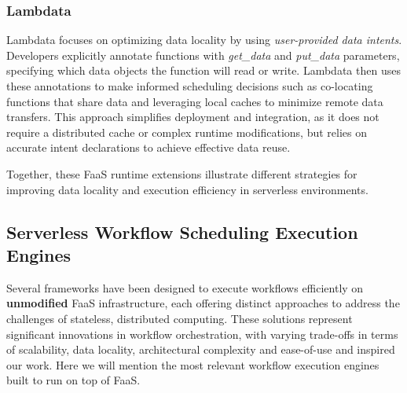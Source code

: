 \documentclass[conference]{IEEEtran}
\begin{document}
\subsubsection{Lambdata}
Lambdata focuses on optimizing data locality by using \textit{user-provided data intents}. Developers explicitly annotate functions with \textit{get\_data} and \textit{put\_data} parameters, specifying which data objects the function will read or write. Lambdata then uses these annotations to make informed scheduling decisions such as co-locating functions that share data and leveraging local caches to minimize remote data transfers. This approach simplifies deployment and integration, as it does not require a distributed cache or complex runtime modifications, but relies on accurate intent declarations to achieve effective data reuse.

Together, these FaaS runtime extensions illustrate different strategies for improving data locality and execution efficiency in serverless environments.

\subsection{Serverless Workflow Scheduling Execution Engines}

Several frameworks have been designed to execute workflows efficiently on \textbf{unmodified} FaaS infrastructure, each offering distinct approaches to address the challenges of stateless, distributed computing. These solutions represent significant innovations in workflow orchestration, with varying trade-offs in terms of scalability, data locality, architectural complexity and ease-of-use and inspired our work. Here we will mention the most relevant workflow execution engines built to run on top of FaaS.
\end{document}
